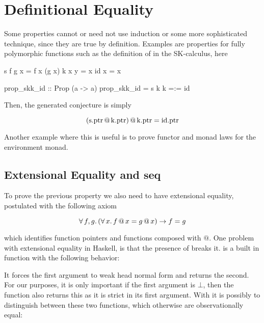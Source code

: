 \section{Definitional Equality}
\label{sec:equality}

Some properties cannot or need not use induction or some more
sophisticated technique, since they are true by definition. Examples
are properties for fully polymorphic functions such as the definition
of  in the SK-calculus, here

\begin{code}
s f g x = f x (g x)
k x y = x
id x = x

prop_skk_id :: Prop (a -> a)
prop_skk_id = s k k =:= id
\end{code}

Then, the generated conjecture is simply

\begin{equation*}
(\mathrm{s.ptr} \, @ \, \mathrm{k.ptr} )
     \, @ \, \mathrm{k.ptr} = \mathrm{id.ptr}
\end{equation*}

Another example where this is useful is to prove functor and monad
laws for the environment monad.

\subsection{Extensional Equality and seq}

To prove the previous property we also need to have extensional
equality, postulated with the following axiom

\begin{equation*}
\forall \, f , g . \, (\forall \, x . \, f \, @ \, x = g \, @ \, x) \rightarrow f = g
\end{equation*}

\noindent
which identifies function pointers and functions composed with $@$.
One problem with extensional equality in Haskell, is that the presence
of  breaks it.  is a built in function with the
following behavior:


It forces the first argument to weak head normal form and returns the
second. For our purposes, it is only important if the first argument
is $\bot$, then the function also returns this as it is strict in its
first argument. With  it is possibly to distinguish between
these two functions, which otherwise are observationally equal:

